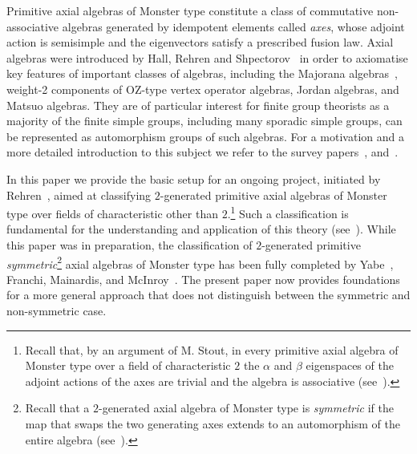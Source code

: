 \documentclass[a4paper]{amsart}
\begin{document}
Primitive axial algebras of Monster type constitute a class of commutative non-associative algebras 
generated by idempotent elements called {\it axes}, whose adjoint action is 
semisimple and the eigenvectors satisfy a prescribed fusion law. Axial 
algebras were introduced by Hall, Rehren and Shpectorov~\cite{HRS,HRS1} in 
order to axiomatise key features of important classes of algebras, including 
the Majorana algebras~\cite{Mb}, weight-2 components of OZ-type 
vertex operator algebras, Jordan algebras, and Matsuo algebras.
 They are of 
particular interest for finite group theorists as a majority of the finite 
simple groups, including many sporadic simple groups, can be represented as 
automorphism groups of such algebras. For a motivation and a more detailed introduction to this subject we refer to the survey papers~\cite{surveyI}, and~\cite{surveyS}.

In this paper we provide the basic setup for an ongoing project, initiated by Rehren~\cite{R}, aimed at classifying $2$-generated primitive axial algebras of Monster type over fields of characteristic other than $2$.\footnote{Recall that, by an argument of M. Stout, in every primitive axial algebra of Monster type over a field of characteristic $2$ the $\alpha$ and $\beta$ eigenspaces of the adjoint actions of the axes are trivial and the algebra is associative (see~\cite[Lemma 2.1]{HW}).} Such a classification is fundamental  for the understanding and application of this theory (see~\cite{Novosibirsk}). While this paper was in preparation, the  classification of $2$-generated primitive \textit{symmetric}\footnote{Recall that a $2$-generated axial algebra of Monster type is \textit{symmetric} if the map that swaps the two generating axes extends to an automorphism of the entire algebra (see~\cite{FMS2}).} axial algebras of Monster type  has been fully completed by Yabe~\cite{Yabe}, Franchi, Mainardis, and McInroy~\cite{HW5, FMM}. The present paper now provides foundations for a more general 
approach that does not distinguish between the symmetric and non-symmetric case.
\end{document}
